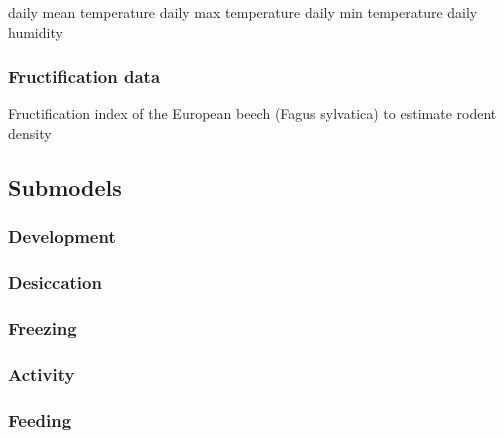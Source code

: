 \documentclass[a4paper, 11pt]{scrartcl}
\begin{document}
daily mean temperature
daily max temperature
daily min temperature
daily humidity


\subsubsection{Fructification data}
Fructification index of the European beech (Fagus sylvatica)
to estimate rodent density


\subsection{Submodels}

\subsubsection{Development}

\subsubsection{Desiccation}

\subsubsection{Freezing}

\subsubsection{Activity}

\subsubsection{Feeding}



\newpage
\printbibliography[heading = bibintoc, title = {Bibliography}]
\end{document}
